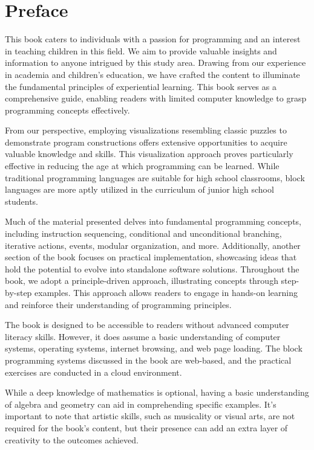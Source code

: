 \chapter*{Preface}
\thispagestyle{empty}

This book caters to individuals with a passion for programming and an interest in teaching children in this field. We aim to provide valuable insights and information to anyone intrigued by this study area. Drawing from our experience in academia and children's education, we have crafted the content to illuminate the fundamental principles of experiential learning. This book serves as a comprehensive guide, enabling readers with limited computer knowledge to grasp programming concepts effectively.

From our perspective, employing visualizations resembling classic puzzles to demonstrate program constructions offers extensive opportunities to acquire valuable knowledge and skills. This visualization approach proves particularly effective in reducing the age at which programming can be learned. While traditional programming languages are suitable for high school classrooms, block languages are more aptly utilized in the curriculum of junior high school students.

Much of the material presented delves into fundamental programming concepts, including instruction sequencing, conditional and unconditional branching, iterative actions, events, modular organization, and more. Additionally, another section of the book focuses on practical implementation, showcasing ideas that hold the potential to evolve into standalone software solutions. Throughout the book, we adopt a principle-driven approach, illustrating concepts through step-by-step examples. This approach allows readers to engage in hands-on learning and reinforce their understanding of programming principles.

The book is designed to be accessible to readers without advanced computer literacy skills. However, it does assume a basic understanding of computer systems, operating systems, internet browsing, and web page loading. The block programming systems discussed in the book are web-based, and the practical exercises are conducted in a cloud environment.

While a deep knowledge of mathematics is optional, having a basic understanding of algebra and geometry can aid in comprehending specific examples. It's important to note that artistic skills, such as musicality or visual arts, are not required for the book's content, but their presence can add an extra layer of creativity to the outcomes achieved.

